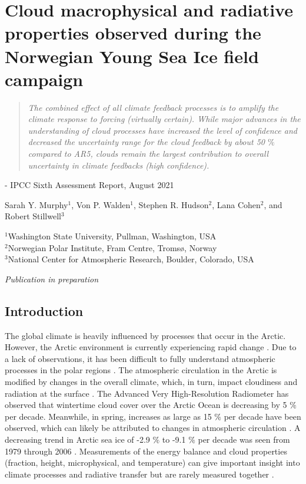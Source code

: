 \chapter{Cloud macrophysical and radiative properties observed during the Norwegian Young Sea Ice field campaign}
\vspace{1 cm}
\begin{spacing}{1} \begin{quote} 
\noindent \emph{The combined effect of all climate feedback processes is to amplify the climate response to forcing (virtually certain). While major advances in the understanding of cloud processes have increased the level of confidence and decreased the uncertainty range for the cloud feedback by about 50 $\%$ compared to AR5, clouds remain the largest contribution to overall uncertainty in climate feedbacks (high confidence).} \end{quote}
\hspace{6 cm} - IPCC Sixth Assessment Report, August 2021  
\end{spacing}
\vspace{1 cm}
\noindent Sarah Y. Murphy$^1$, Von P. Walden$^1$, Stephen R. Hudson$^2$, Lana Cohen$^2$, and Robert Stillwell$^3$ 


\noindent $^1$Washington State University, Pullman, Washington, USA\\
$^2$Norwegian Polar Institute, Fram Centre, Tromsø, Norway\\
$^3$National Center for Atmospheric Research, Boulder, Colorado, USA\\

\begin{center}
    \emph{Publication in preparation}
\end{center}

\section{Introduction}

The global climate is heavily influenced by processes that occur in the Arctic. However, the Arctic environment is currently experiencing rapid change \citep{overland:2011, stroeve:2007}. Due to a lack of observations, it has been difficult to fully understand atmospheric processes in the polar regions \citep{persson:2002}. The atmospheric circulation in the Arctic is modified by changes in the overall climate, which, in turn, impact cloudiness and radiation at the surface \citep{zhang:2008}. The Advanced Very High-Resolution Radiometer has observed that wintertime cloud cover over the Arctic Ocean is decreasing by 5 $\%$ per decade. Meanwhile, in spring, increases as large as 15 $\%$ per decade have been observed, which can likely be attributed to changes in atmospheric circulation \citep{schweiger:2004}. A decreasing trend in Arctic sea ice of -2.9 $\%$ to -9.1 $\%$ per decade was seen from 1979 through 2006 \citep{stroeve:2007}. Measurements of the energy balance and cloud properties (fraction, height, microphysical, and temperature) can give important insight into climate processes and radiative transfer but are rarely measured together \citep{persson:2002, schweiger:2004, miller:2017}. 


